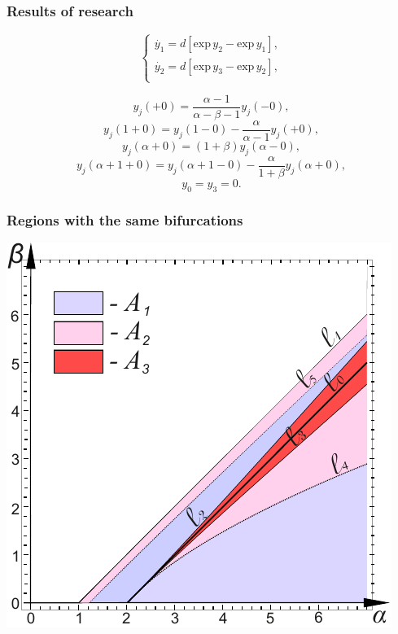 \documentclass[fullscreen=true, unicode, bookmarks=false]{beamer}
\begin{document}
\begin{frame}
\frametitle{Results of research} 

$$
\begin{cases}
	\dot{y_1} = d[\mbox{exp} \, y_2 - \mbox{exp} \, y_1 ], \\
	\dot{y_2} = d[\mbox{exp} \, y_3 - \mbox{exp} \, y_2 ], \\
\end{cases}
$$

\medskip

$$ y_j(+0) = \frac{\alpha -1}{\alpha - \beta - 1}y_j(-0), $$
$$ y_j(1+0) = y_j(1-0) - \frac{\alpha}{\alpha - 1}y_j(+0), $$
$$ y_j(\alpha + 0) = (1 + \beta)y_j(\alpha - 0), $$
$$ y_j(\alpha + 1 + 0) = y_j(\alpha + 1 - 0) - \frac{\alpha}{1 + \beta}y_j(\alpha + 0), $$
$$ y_0 = y_3 = 0.  $$

\end{frame}

\begin{frame}
\frametitle{Regions with the same bifurcations} 
\begin{center}
  \includegraphics[scale=0.9]{Areas_uniwave.pdf}  
 \end{center}
\end{frame}
\end{document}
